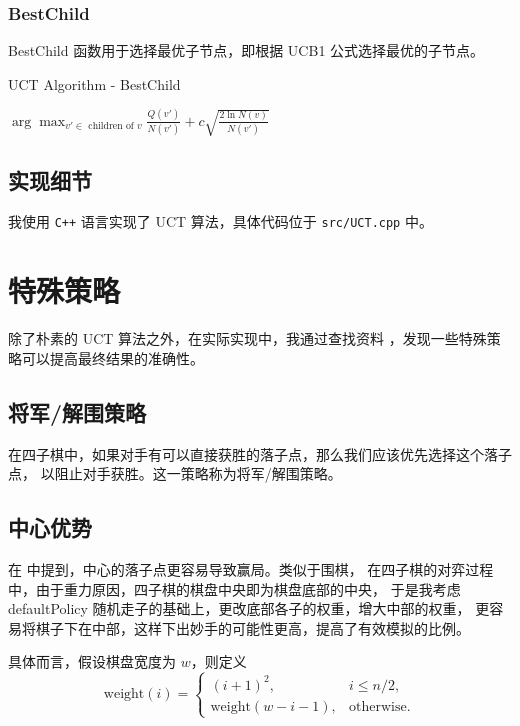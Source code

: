 \documentclass[UTF8]{ctexart}
\begin{document}
\subsubsection{BestChild}

BestChild 函数用于选择最优子节点，即根据 UCB1 公式选择最优的子节点。

\begin{algorithm}[H]
    \caption{UCT Algorithm - BestChild}
    \begin{algorithmic}
            \State \Return $\arg\max_{v' \in \text{ children of }v} \frac{Q(v')}{N(v')} + c \sqrt{\frac{2\ln N(v)}{N(v')}}$
        \EndFunction
    \end{algorithmic}
\end{algorithm}

\subsection{实现细节}

我使用 \texttt{C++} 语言实现了 UCT 算法，具体代码位于 \texttt{src/UCT.cpp} 中。

\section{特殊策略}

除了朴素的 UCT 算法之外，在实际实现中，我通过查找资料 \cite{Connect4-github}，发现一些特殊策略可以提高最终结果的准确性。

\subsection{将军/解围策略}

在四子棋中，如果对手有可以直接获胜的落子点，那么我们应该优先选择这个落子点，
以阻止对手获胜。这一策略称为将军/解围策略。

\subsection{中心优势}

在 \cite{Connect4-github} 中提到，中心的落子点更容易导致赢局。类似于围棋，
在四子棋的对弈过程中，由于重力原因，四子棋的棋盘中央即为棋盘底部的中央，
于是我考虑 defaultPolicy 随机走子的基础上，更改底部各子的权重，增大中部的权重，
更容易将棋子下在中部，这样下出妙手的可能性更高，提高了有效模拟的比例。

具体而言，假设棋盘宽度为 $w$，则定义
\begin{equation*}
    \text{weight}(i) = \begin{cases}
        (i + 1)^2, & i \le n/2, \\
        \text{weight}(w - i - 1), & \text{otherwise}.
    \end{cases}
\end{equation*}
\end{document}
